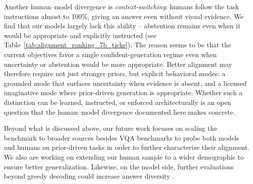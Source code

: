 \documentclass[letterpaper]{article}
\begin{document}
Another human--model divergence is \emph{context-switching}: humans follow the task instructions almost to 100\%, giving an answer even without visual evidence.  
We find that our models largely lack this ability -- abstention remains even when it would be appropriate and explicitly instructed (see Table~\ref{tab:alignment_ranking_7b_ticks}). 
The reason seems to be that the current objectives favor a single confident-generation regime even when uncertainty or abstention would be more appropriate. Better alignment may therefore require not just stronger priors, but explicit behavioral modes: a grounded mode that surfaces uncertainty when evidence is absent, and a licensed imaginative mode where prior-driven generation is appropriate.
Whether such a distinction can be learned, instructed, or enforced architecturally is an open question that the human--model divergence documented here makes concrete.


Beyond what is discussed above, our future work focuses on scaling the benchmark to broader sources besides VQA benchmarks to probe both models and humans on prior-driven tasks in order to further characterize their alignment. We also are working on extending our human sample to a wider demographic to ensure better generalization.
Likewise, on the model side, further evaluations beyond greedy decoding could increase answer diversity \citep{holtzman2020curious}.


\end{document}
